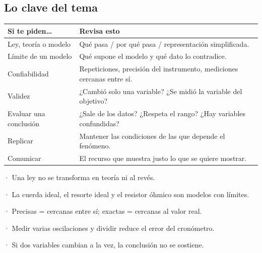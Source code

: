 \subsection{Lo clave del tema}
\begin{center}\small
\begin{tabularx}{\linewidth}{@{}>{\raggedright\arraybackslash\hsize=0.71\hsize}X>{\raggedright\arraybackslash\hsize=1.29\hsize}X@{}}
\toprule
\textbf{Si te piden\dots{}} & \textbf{Revisa esto} \\
\midrule
Ley, teoría o modelo & Qué pasa / por qué pasa / representación simplificada. \\
Límite de un modelo & Qué supone el modelo y qué dato lo contradice. \\
Confiabilidad & Repeticiones, precisión del instrumento, mediciones cercanas entre sí. \\
Validez & ¿Cambió solo una variable? ¿Se midió la variable del objetivo? \\
Evaluar una conclusión & ¿Sale de los datos? ¿Respeta el rango? ¿Hay variables confundidas? \\
Replicar & Mantener las condiciones de las que depende el fenómeno. \\
Comunicar & El recurso que muestra justo lo que se quiere mostrar. \\
\bottomrule
\end{tabularx}
\end{center}
 
\begin{clave}[{Recuerda}] · Una ley no se transforma en teoría ni al revés.\par · La cuerda ideal, el resorte ideal y el resistor óhmico son modelos con límites.\par · Precisas = cercanas entre sí; exactas = cercanas al valor real.\par · Medir varias oscilaciones y dividir reduce el error del cronómetro.\par · Si dos variables cambian a la vez, la conclusión no se sostiene.\end{clave}
 
